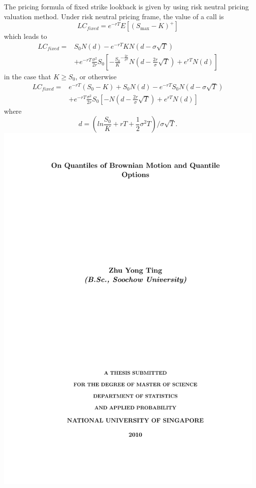 \documentclass[11pt]{book}
\begin{document}
The pricing formula of fixed strike lookback is given by \cite{Conze1991} using risk neutral pricing valuation method. Under risk neutral pricing frame, the value of a call is 
\begin{equation}
LC_{fixed} = e^{-rT}E[(S_{\max}-K)^{+}]
\end{equation}
which leads to 
\begin{equation}
\begin{split}
LC_{fixed} =& S_0 N(d) - e^{-rT}KN(d-\sigma \sqrt{T}) \\
&+ e^{-rT} \frac{\sigma^2}{2r} S_0 [ -{\frac{S_0}{K}}^{-\frac{2r}{\sigma^2}} N(d-\frac{2r}{\sigma}\sqrt{T}) + e^{rT}N(d)] 
\end{split}
\end{equation}
in the case that $K\geq S_0$, or otherwise
\begin{equation}
\begin{split}
LC_{fixed} = & e^{-rT}(S_0 - K) + S_0 N(d) - e^{-rT}S_0 N(d-\sigma \sqrt{T}) \\
&+ e^{-rT} \frac{\sigma ^2}{2r} S_0 [ -N(d-\frac{2r}{\sigma}\sqrt{T}) + e^{rT}N(d)]
\end{split}
\end{equation}
where
\begin{equation}
d = ( ln\frac{S_0}{K} + rT + \frac{1}{2} \sigma^2 T)/ {\sigma \sqrt{T}}.
\end{equation}
\includegraphics[]{notes.pdf}
\end{document}
